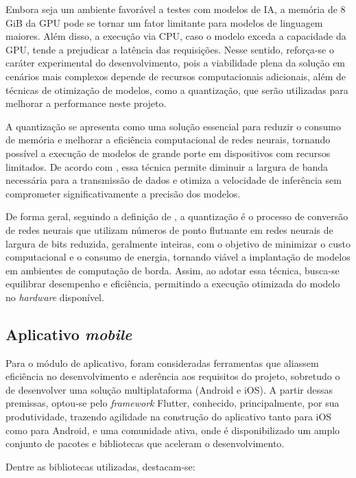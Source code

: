 Embora seja um ambiente favorável a testes com modelos de IA, a memória de 8 GiB da GPU pode se tornar um fator limitante para modelos de linguagem maiores. Além disso, a execução via CPU, caso o modelo exceda a capacidade da GPU, tende a prejudicar a latência das requisições. Nesse sentido, reforça-se o caráter experimental do desenvolvimento, pois a viabilidade plena da solução em cenários mais complexos depende de recursos computacionais adicionais, além de técnicas de otimização de modelos, como a quantização, que serão utilizadas para melhorar a performance neste projeto.

A quantização se apresenta como uma solução essencial para reduzir o consumo de memória e melhorar a eficiência computacional de redes neurais, tornando possível a execução de modelos de grande porte em dispositivos com recursos limitados. De acordo com , essa técnica permite diminuir a largura de banda necessária para a transmissão de dados e otimiza a velocidade de inferência sem comprometer significativamente a precisão dos modelos.

De forma geral, seguindo a definição de , a quantização é o processo de conversão de redes neurais que utilizam números de ponto flutuante em redes neurais de largura de bits reduzida, geralmente inteiras, com o objetivo de minimizar o custo computacional e o consumo de energia, tornando viável a implantação de modelos em ambientes de computação de borda. Assim, ao adotar essa técnica, busca-se equilibrar desempenho e eficiência, permitindo a execução otimizada do modelo no \textit{hardware} disponível.

\subsection{Aplicativo \textit{mobile}}

Para o módulo de aplicativo, foram consideradas ferramentas que aliassem eficiência no desenvolvimento e aderência aos requisitos do projeto, sobretudo o de desenvolver uma solução multiplataforma (Android e iOS). A partir dessas premissas, optou-se pelo \textit{framework} Flutter, conhecido, principalmente, por sua produtividade, trazendo agilidade na construção do aplicativo tanto para iOS como para Android, e uma comunidade ativa, onde é disponibilizado um amplo conjunto de pacotes e bibliotecas que aceleram o desenvolvimento.

Dentre as bibliotecas utilizadas, destacam-se:

